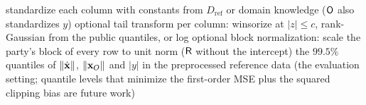 \begin{algorithm}[p]
\begin{algorithmic}[1]
\EndFunction
\Statex
{} 
  \State standardize each column with constants from $D_{\mathrm{ref}}$ or domain knowledge ($\textsf{O}$ also standardizes $y$)
  \State optional tail transform per column: winsorize at $|z|\le c$, rank-Gaussian from the public quantiles, or log
  \State optional block normalization: scale the party's block of every row to unit norm ($\textsf{R}$ without the intercept)
\EndFunction
\Statex
{} the $99.5\%$ quantiles of $\|\dot{\mathbf{x}}\|$, $\|\mathbf{x}_O\|$ and $|y|$ in the preprocessed reference data
\Statex \hspace{\algorithmicindent}(the evaluation setting; quantile levels that minimize the first-order MSE plus the squared clipping bias are future work)
\EndFunction
\end{algorithmic}
\end{algorithm}
